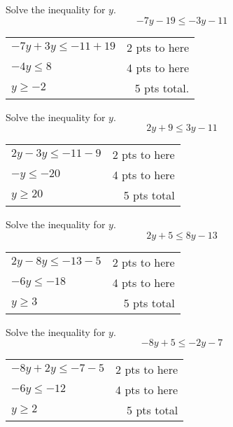 {
	Solve the inequality for $y$. $$-7y-19 \leq -3y-11$$
}
{
	\begin{tabular}{l r}
	$-7y+3y\leq -11+19$ & 2 pts to here \\
	$-4y\leq 8$ & 4 pts to here \\
	$y \geq -2$ & 5 pts total.
	\end{tabular}
}

{
	Solve the inequality for $y$. $$2y+9\leq 3y-11$$
}
{
	\begin{tabular}{l r}
	$2y-3y\leq -11-9$ & 2 pts to here\\
	$-y\leq -20$ & 4 pts to here\\
	$y\geq 20$ & 5 pts total
	\end{tabular}
}

{
	Solve the inequality for $y$. $$2y+5\leq 8y-13$$
}
{
	\begin{tabular}{l r}
	$2y-8y\leq -13-5$ & 2 pts to here\\
	$-6y\leq -18$ & 4 pts to here\\
	$y\geq 3$ & 5 pts total
	\end{tabular}
}

{
	Solve the inequality for $y$. $$-8y+5\leq-2y-7$$
}
{
	\begin{tabular}{l r}
	$-8y+2y\leq -7-5$ & 2 pts to here\\
	$-6y \leq -12$ & 4 pts to here\\
	$y\geq 2 $ & 5 pts total
	\end{tabular}
}

